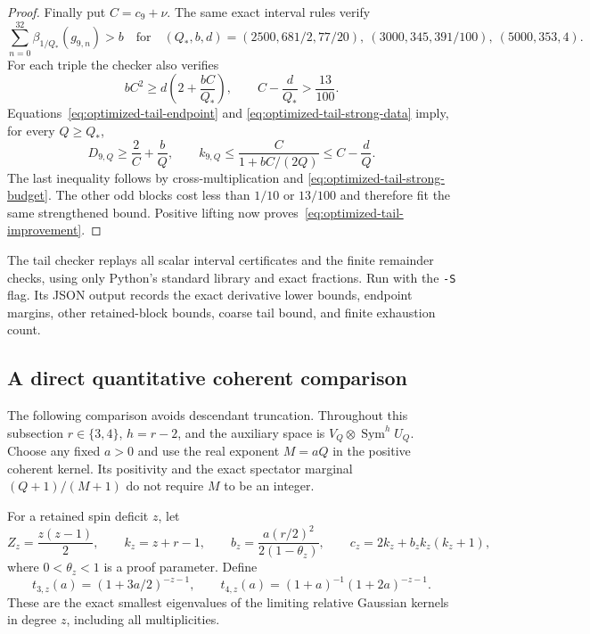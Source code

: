 \documentclass[11pt]{article}
\newcommand{\Sym}{\operatorname{Sym}}
\begin{document}
\begin{proof}
Finally put $C=c_9+\nu$. The same exact interval rules verify
\begin{equation}\label{eq:optimized-tail-strong-data}
 \sum_{n=0}^{32}\beta_{1/Q_*}(g_{9,n})>b
 \quad\text{for}\quad
 (Q_*,b,d)=(2500,681/2,77/20),\ (3000,345,391/100),\ (5000,353,4).
\end{equation}
For each triple the checker also verifies
\begin{equation}\label{eq:optimized-tail-strong-budget}
 bC^2\ge d\left(2+\frac{bC}{Q_*}\right),
 \qquad C-\frac d{Q_*}>\frac{13}{100}.
\end{equation}
Equations~\eqref{eq:optimized-tail-endpoint} and
\eqref{eq:optimized-tail-strong-data} imply, for every $Q\ge Q_*$,
\begin{equation}
 D_{9,Q}\ge\frac2C+\frac bQ,
 \qquad k_{9,Q}\le\frac{C}{1+bC/(2Q)}\le C-\frac dQ.
\end{equation}
The last inequality follows by cross-multiplication and
\eqref{eq:optimized-tail-strong-budget}. The other odd blocks cost less than
$1/10$ or $13/100$ and therefore fit the same strengthened bound. Positive
lifting now proves~\eqref{eq:optimized-tail-improvement}.
\end{proof}

The tail checker replays all scalar interval certificates and the finite
remainder checks, using only Python's standard library and exact fractions.
Run  with the \texttt{-S} flag.
Its JSON output records the exact derivative
lower bounds, endpoint margins, other retained-block bounds, coarse tail
bound, and finite exhaustion count.

\subsection{A direct quantitative coherent comparison}
\label{app:optimized-coherent}

The following comparison avoids descendant truncation. Throughout this
subsection $r\in\{3,4\}$, $h=r-2$, and the auxiliary space is
$V_Q\otimes\Sym^hU_Q$. Choose any fixed $a>0$ and use the real exponent
$M=aQ$ in the positive coherent kernel. Its positivity and the exact
spectator marginal $(Q+1)/(M+1)$ do not require $M$ to be an integer.

For a retained spin deficit $z$, let
\begin{equation}\label{eq:opt-coh-parameters}
 Z_z=\frac{z(z-1)}2,\qquad k_z=z+r-1,\qquad
 b_z=\frac{a(r/2)^2}{2(1-\theta_z)},\qquad
 c_z=2k_z+b_zk_z(k_z+1),
\end{equation}
where $0<\theta_z<1$ is a proof parameter. Define
\begin{equation}
 t_{3,z}(a)=(1+3a/2)^{-z-1},\qquad
 t_{4,z}(a)=(1+a)^{-1}(1+2a)^{-z-1}.
\end{equation}
These are the exact smallest eigenvalues of the limiting relative
Gaussian kernels in degree $z$, including all multiplicities.
\end{document}

